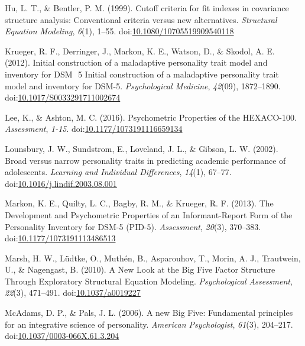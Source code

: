 \documentclass[,man,floatsintext]{apa6}
\theoremstyle{definition}
\theoremstyle{definition}
\theoremstyle{definition}
\theoremstyle{remark}
\begin{document}
\leavevmode\hypertarget{ref-Hu1999}{}%
Hu, L. T., \& Bentler, P. M. (1999). Cutoff criteria for fit indexes in
covariance structure analysis: Conventional criteria versus new
alternatives. \emph{Structural Equation Modeling}, \emph{6}(1), 1--55.
doi:\href{https://doi.org/10.1080/10705519909540118}{10.1080/10705519909540118}

\leavevmode\hypertarget{ref-Krueger2012a}{}%
Krueger, R. F., Derringer, J., Markon, K. E., Watson, D., \& Skodol, A.
E. (2012). Initial construction of a maladaptive personality trait model
and inventory for DSM ­ 5 Initial construction of a maladaptive
personality trait model and inventory for DSM-5. \emph{Psychological
Medicine}, \emph{42}(09), 1872--1890.
doi:\href{https://doi.org/10.1017/S0033291711002674}{10.1017/S0033291711002674}

\leavevmode\hypertarget{ref-Lee2016}{}%
Lee, K., \& Ashton, M. C. (2016). Psychometric Properties of the
HEXACO-100. \emph{Assessment}, \emph{1-15}.
doi:\href{https://doi.org/10.1177/1073191116659134}{10.1177/1073191116659134}

\leavevmode\hypertarget{ref-Lounsbury2002}{}%
Lounsbury, J. W., Sundstrom, E., Loveland, J. L., \& Gibson, L. W.
(2002). Broad versus narrow personality traits in predicting academic
performance of adolescents. \emph{Learning and Individual Differences},
\emph{14}(1), 67--77.
doi:\href{https://doi.org/10.1016/j.lindif.2003.08.001}{10.1016/j.lindif.2003.08.001}

\leavevmode\hypertarget{ref-Markon2013}{}%
Markon, K. E., Quilty, L. C., Bagby, R. M., \& Krueger, R. F. (2013).
The Development and Psychometric Properties of an Informant-Report Form
of the Personality Inventory for DSM-5 (PID-5). \emph{Assessment},
\emph{20}(3), 370--383.
doi:\href{https://doi.org/10.1177/1073191113486513}{10.1177/1073191113486513}

\leavevmode\hypertarget{ref-Marsh2010}{}%
Marsh, H. W., Lüdtke, O., Muthén, B., Asparouhov, T., Morin, A. J.,
Trautwein, U., \& Nagengast, B. (2010). A New Look at the Big Five
Factor Structure Through Exploratory Structural Equation Modeling.
\emph{Psychological Assessment}, \emph{22}(3), 471--491.
doi:\href{https://doi.org/10.1037/a0019227}{10.1037/a0019227}

\leavevmode\hypertarget{ref-McAdams2006a}{}%
McAdams, D. P., \& Pals, J. L. (2006). A new Big Five: Fundamental
principles for an integrative science of personality. \emph{American
Psychologist}, \emph{61}(3), 204--217.
doi:\href{https://doi.org/10.1037/0003-066X.61.3.204}{10.1037/0003-066X.61.3.204}
\end{document}
